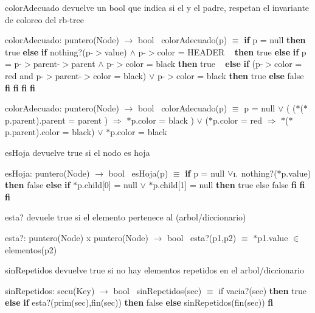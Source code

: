 \begin{DoxyParagraph}{color\+Adecuado}
devuelve un bool que indica si el y el padre, respetan el invariante de coloreo del rb-\/tree

color\+Adecuado\+: puntero(\+Node) $\to$ bool~\newline
 color\+Adecuado(p) $\equiv$ {\bfseries if} p = null {\bfseries then} true {\bfseries else} {\bfseries if} nothing?(p-\/$>$value) $\land$ p-\/$>$color = H\+E\+A\+D\+ER ~\newline
 {\bfseries then} true {\bfseries else} {\bfseries if} p = p-\/$>$parent-\/$>$parent $\land$ p-\/$>$color = black {\bfseries then} true ~\newline
 {\bfseries else} {\bfseries if} (p-\/$>$color = red and p-\/$>$parent-\/$>$color = black) $\lor$ p-\/$>$color = black {\bfseries then} true {\bfseries else} false {\bfseries fi} {\bfseries fi} {\bfseries fi} {\bfseries fi} 

color\+Adecuado\+: puntero(\+Node) $\to$ bool~\newline
 color\+Adecuado(p) $\equiv$ p = null $\lor$ ( ($\ast$($\ast$p.parent).parent = parent ) $\Rightarrow$ $\ast$p.color = black ) $\lor$ ($\ast$p.color = red $\Rightarrow$ $\ast$($\ast$p.parent).color = black) $\lor$ $\ast$p.color = black 
\end{DoxyParagraph}


\begin{DoxyParagraph}{es\+Hoja}
devuelve true si el nodo es hoja

es\+Hoja\+: puntero(\+Node) $\to$ bool~\newline
 es\+Hoja(p) $\equiv$ {\bfseries if} p = null $\lor_{\rm L}$ nothing?($\ast$p.value) {\bfseries then} false {\bfseries else} {\bfseries if} $\ast$p.child\mbox{[}0\mbox{]} = null $\lor$ $\ast$p.child\mbox{[}1\mbox{]} = null {\bfseries then} true else false {\bfseries fi} {\bfseries fi} {\bfseries fi} 
\end{DoxyParagraph}


\begin{DoxyParagraph}{esta?}
devuele true si el elemento pertenece al (arbol/diccionario)

esta?\+: puntero(\+Node) x puntero(\+Node) $\to$ bool~\newline
 esta?(p1,p2) $\equiv$ $\ast$p1.value $\in$ elementos(p2) 
\end{DoxyParagraph}


\begin{DoxyParagraph}{sin\+Repetidos}
devuelve true si no hay elementos repetidos en el arbol/diccionario

sin\+Repetidos\+: secu(\+Key) $\to$ bool~\newline
 sin\+Repetidos(sec) $\equiv$ if vacia?(sec) {\bfseries then} true {\bfseries else} {\bfseries if} esta?(prim(sec),fin(sec)) {\bfseries then} false {\bfseries else} sin\+Repetidos(fin(sec)) {\bfseries fi} 
\end{DoxyParagraph}


